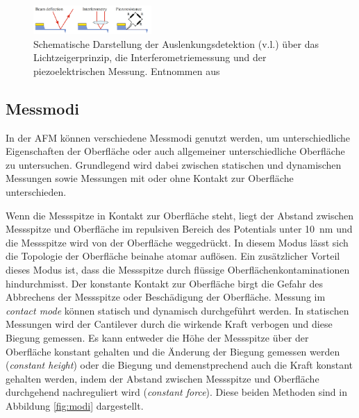           \FloatBarrier

          \begin{figure}[h]
            \centering
            \includegraphics[width = 0.4\textwidth]{pictures/detektion.png}
            \caption{Schematische Darstellung der Auslenkungsdetektion (v.l.) über das Lichtzeigerprinzip, die Interferometriemessung und der piezoelektrischen Messung. Entnommen aus \cite{park_systems_force-distance_nodate}}
            \label{fig:detektion}
          \end{figure}
        
          \FloatBarrier

      

      \newpage
      \subsection{Messmodi}
          In der AFM können verschiedene Messmodi genutzt werden, um unterschiedliche Eigenschaften der Oberfläche oder auch allgemeiner unterschiedliche Oberfläche zu untersuchen. Grundlegend wird dabei 
          zwischen statischen und dynamischen Messungen sowie Messungen mit oder ohne Kontakt zur Oberfläche unterschieden. 

          Wenn die Messspitze in Kontakt zur Oberfläche steht, liegt der Abstand zwischen Messspitze und Oberfläche im repulsiven Bereich des Potentials unter \SI{10}{\nano\metre} und die Messspitze wird von 
          der Oberfläche weggedrückt. In diesem Modus lässt sich die Topologie der Oberfläche beinahe atomar auflösen. Ein zusätzlicher Vorteil dieses Modus ist, dass die Messspitze durch flüssige 
          Oberflächenkontaminationen hindurchmisst. Der konstante Kontakt zur Oberfläche birgt die Gefahr des Abbrechens der Messspitze oder Beschädigung der Oberfläche. Messung im \textit{contact mode}
          können statisch und dynamisch durchgeführt werden. In statischen Messungen wird der Cantilever durch die wirkende Kraft verbogen und diese Biegung gemessen. Es kann entweder die Höhe der Messspitze
          über der Oberfläche konstant gehalten und die Änderung der Biegung gemessen werden (\textit{constant height}) oder die Biegung  und demenstprechend auch die Kraft konstant gehalten werden, indem
          der Abstand zwischen Messspitze und Oberfläche durchgehend nachreguliert wird (\textit{constant force}). Diese beiden Methoden sind in Abbildung \ref{fig:modi} dargestellt. 
          
